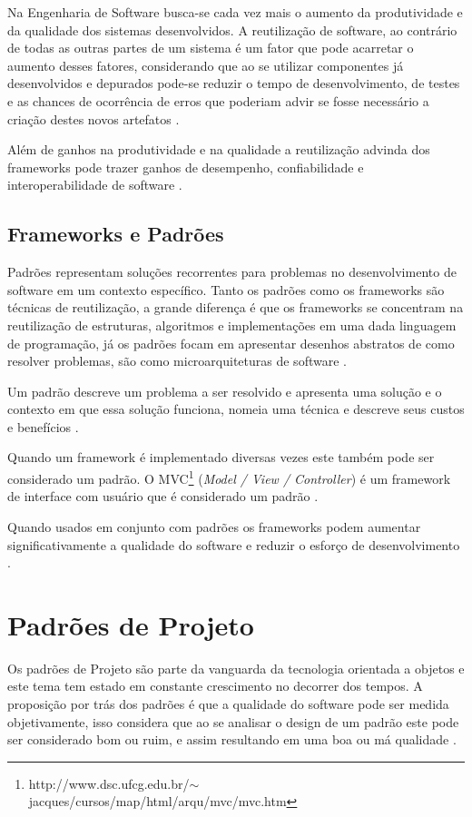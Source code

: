 Na Engenharia de Software busca-se cada vez mais o aumento da produtividade e da qualidade dos sistemas desenvolvidos. A reutilização de software, ao contrário de todas as outras partes de um sistema é um fator que pode acarretar o aumento desses fatores, considerando que ao se utilizar componentes já desenvolvidos e depurados pode-se reduzir o tempo de desenvolvimento, de testes e as chances de ocorrência de erros que poderiam advir se fosse necessário a criação destes novos artefatos \cite{Silva:2000}.

Além de ganhos na produtividade e na qualidade a reutilização advinda dos frameworks pode trazer ganhos de desempenho, confiabilidade e interoperabilidade de software \cite{Fayad:Schimidt:1997}.

\subsection{Frameworks e Padrões}

Padrões representam soluções recorrentes para problemas no desenvolvimento de software em um contexto específico. Tanto os padrões como os frameworks são técnicas de reutilização, a grande diferença é que os frameworks 	se concentram na reutilização de estruturas, algoritmos e implementações em uma dada linguagem de programação, já os padrões focam em apresentar desenhos abstratos de como resolver problemas, são como microarquiteturas de software \cite{Fayad:Schimidt:1997}.

Um padrão descreve um problema a ser resolvido e apresenta uma solução e o contexto em que essa solução funciona, nomeia uma técnica e descreve seus custos e benefícios \cite{Johnson:1997}.

Quando um framework é implementado diversas vezes este também pode ser considerado um padrão. O MVC\footnote{http://www.dsc.ufcg.edu.br/$\sim$jacques/cursos/map/html/arqu/mvc/mvc.htm} (\textit{Model / View / Controller}) é um framework de interface com usuário que é considerado um padrão \cite{Johnson:1997}.

Quando usados em conjunto com padrões os frameworks podem aumentar significativamente a qualidade do software e reduzir o esforço de desenvolvimento \cite{Fayad:Schimidt:1997}.

\section{Padrões de Projeto}

Os padrões de Projeto são parte da vanguarda da tecnologia orientada a objetos e este tema tem estado em constante crescimento no decorrer dos tempos. A proposição por trás dos padrões é que a qualidade do software pode ser medida objetivamente, isso considera que ao se analisar o design de um padrão este pode ser considerado bom ou ruim, e assim resultando em uma boa ou má qualidade \cite{Shalloway:Trott:2004}.

